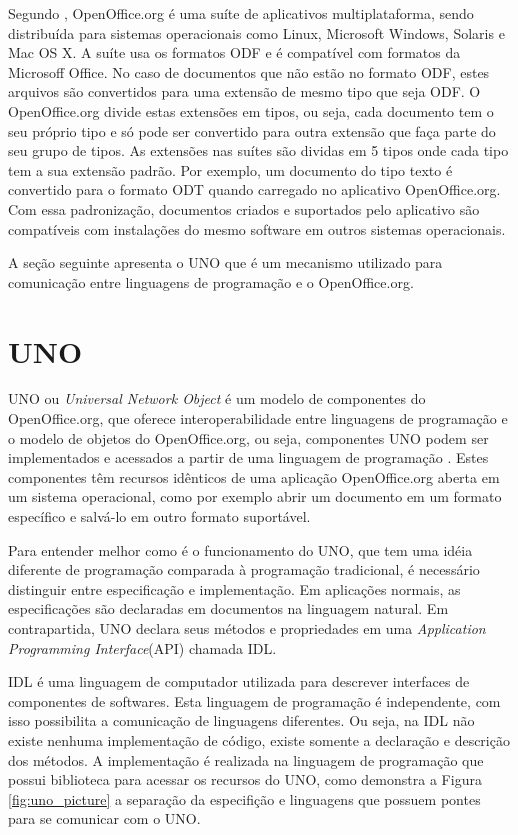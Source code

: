 Segundo \cite{ronaldo}, OpenOffice.org é uma suíte de aplicativos multiplataforma, sendo distribuída para sistemas operacionais como Linux, Microsoft Windows, Solaris e Mac OS X. A suíte usa os formatos ODF e é compatível com formatos da Microsoff Office. No caso de documentos que não estão no formato ODF, estes arquivos são convertidos para uma extensão de mesmo tipo que seja ODF. O OpenOffice.org divide estas extensões em tipos, ou seja, cada documento tem o seu próprio tipo e só pode ser convertido para outra extensão que faça parte do seu grupo de tipos. As extensões nas suítes são dividas em 5 tipos onde cada tipo tem a sua extensão padrão. Por exemplo, um documento do tipo texto é convertido para o formato ODT quando carregado no aplicativo OpenOffice.org. Com essa padronização, documentos criados e suportados pelo aplicativo são compatíveis com instalações do mesmo software em outros sistemas operacionais.

A seção seguinte apresenta o UNO que é um mecanismo utilizado para comunicação entre linguagens de programação e o OpenOffice.org.

\section{UNO}
UNO ou \textit{Universal Network Object} é um modelo de componentes do OpenOffice.org, que oferece interoperabilidade entre linguagens de programação e o modelo de objetos do OpenOffice.org, ou seja, componentes UNO podem ser implementados e acessados a partir de uma linguagem de programação \cite{uno_page}. Estes componentes têm recursos idênticos de uma aplicação OpenOffice.org aberta em um sistema operacional, como por exemplo abrir um documento em um formato específico e salvá-lo em outro formato suportável.

Para entender melhor como é o funcionamento do UNO, que tem uma idéia diferente de programação comparada à programação tradicional, é necessário distinguir entre especificação e implementação. Em aplicações normais, as especificações são declaradas em documentos na linguagem natural. Em contrapartida, UNO declara seus métodos e propriedades em uma \textit{Application Programming Interface}(API) chamada IDL. 

IDL é uma linguagem de computador utilizada para descrever interfaces de componentes de softwares. Esta linguagem de programação é independente, com isso possibilita a comunicação de linguagens diferentes. Ou seja, na IDL não existe nenhuma implementação de código, existe somente a declaração e descrição dos métodos. A implementação é realizada na linguagem de programação que possui biblioteca para acessar os recursos do UNO, como demonstra a Figura \ref{fig:uno_picture} a separação da especifição e linguagens que possuem pontes para se comunicar com o UNO.

